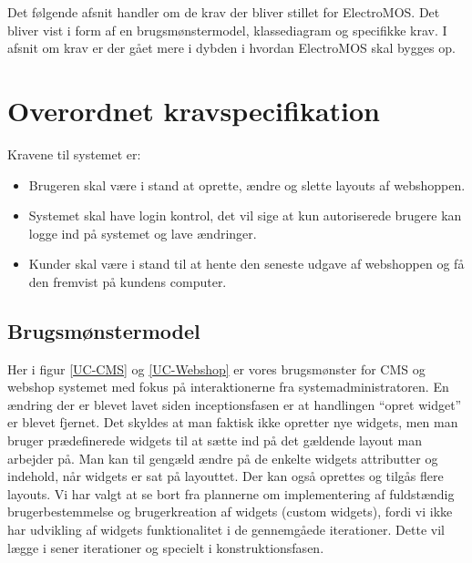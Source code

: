 


Det følgende afsnit handler om de krav der bliver stillet for ElectroMOS. Det bliver vist i form af en brugsmønstermodel, klassediagram og specifikke krav. I afsnit om krav er der gået mere i dybden i hvordan ElectroMOS skal bygges op. 

\section{Overordnet kravspecifikation}
Kravene til systemet er:
\begin{itemize}
\item Brugeren skal være i stand at oprette, ændre og slette layouts af webshoppen.
\item Systemet skal have login kontrol, det vil sige at kun autoriserede brugere kan logge ind på systemet og lave ændringer.
\item Kunder skal være i stand til at hente den seneste udgave af webshoppen og få den fremvist på kundens computer.
\end{itemize}


\subsection{Brugsmønstermodel}
Her i figur \ref{UC-CMS} og \ref{UC-Webshop} er vores brugsmønster for CMS og webshop systemet med fokus på interaktionerne fra systemadministratoren. En ændring der er blevet lavet siden inceptionsfasen er at handlingen “opret widget” er blevet fjernet. Det skyldes at man faktisk ikke opretter nye widgets, men man bruger prædefinerede widgets til at sætte ind på det gældende layout man arbejder på. Man kan til gengæld ændre på de enkelte widgets attributter og indehold, når widgets er sat på layouttet. Der kan også oprettes og tilgås flere layouts. Vi har valgt at se bort fra plannerne om implementering af fuldstændig brugerbestemmelse og brugerkreation af widgets (custom widgets), fordi vi ikke har udvikling af widgets funktionalitet i de gennemgåede iterationer. Dette vil lægge i sener iterationer og specielt i konstruktionsfasen.


\newpage \twocolumn

